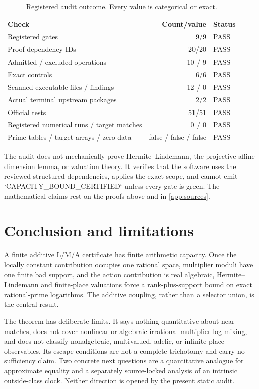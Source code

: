 \documentclass[11pt]{article}
\theoremstyle{definition}
\theoremstyle{remark}
\begin{document}
\begin{table}[t]
\centering
\small
\caption{Registered audit outcome.  Every value is categorical or exact.}
\label{tab:audit}
\begin{tabular}{@{}lrl@{}}
\toprule
Check & Count/value & Status \\
\midrule
Registered gates & 9/9 & PASS \\
Proof dependency IDs & 20/20 & PASS \\
Admitted / excluded operations & 10 / 9 & PASS \\
Exact controls & 6/6 & PASS \\
Scanned executable files / findings & 12 / 0 & PASS \\
Actual terminal upstream packages & 2/2 & PASS \\
Official tests & 51/51 & PASS \\
Registered numerical runs / target matches & 0 / 0 & PASS \\
Prime tables / target arrays / zero data & false / false / false & PASS \\
\bottomrule
\end{tabular}
\end{table}

The audit does not mechanically prove Hermite--Lindemann, the
projective-affine dimension lemma, or valuation theory.  It verifies that the
software uses the reviewed structured dependencies, applies the exact scope,
and cannot emit `CAPACITY\_BOUND\_CERTIFIED` unless every gate is green.  The
mathematical claims rest on the proofs above and in \cref{app:sources}.

\section{Conclusion and limitations}
\label{sec:conclusion}

A finite additive L/M/A certificate has finite arithmetic capacity.  Once the
locally constant contribution occupies one rational space, multiplier
moduli have one finite bad support, and the action contribution is real
algebraic, Hermite--Lindemann and finite-place valuations force a
rank-plus-support bound on exact rational-prime logarithms.  The additive
coupling, rather than a selector union, is the central result.

The theorem has deliberate limits.  It says nothing quantitative about near
matches, does not cover nonlinear or algebraic-irrational multiplier-log
mixing, and does not classify nonalgebraic, multivalued, adelic, or
infinite-place observables.  Its escape conditions are not a complete
trichotomy and carry no sufficiency claim.  Two concrete next questions are a
quantitative analogue for approximate equality and a separately source-locked
analysis of an intrinsic outside-class clock.  Neither direction is opened by
the present static audit.
\end{document}

